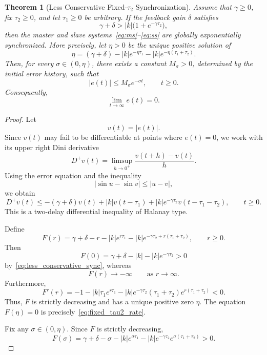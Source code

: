 \documentclass[11pt]{article}
\newtheorem{theorem}{Theorem}[section]
\theoremstyle{remark}
\begin{document}
{


\begin{theorem}[Less Conservative Fixed-$\tau_2$ Synchronization]
\label{thm:fixed_tau2_sync}
Assume that $\gamma\geq0$, fix $\tau_2\geq0$, and let $\tau_1\geq0$ be arbitrary. If the feedback gain $\delta$ satisfies
\begin{equation}
\gamma+\delta>|k|\bigl(1+e^{-\gamma\tau_2}\bigr),
\label{eq:less_conservative_sync}
\end{equation}
then the master and slave systems~\eqref{eq:ms}--\eqref{eq:ss} are globally exponentially synchronized. More precisely, let $\eta>0$ be the unique positive solution of
\begin{equation}
\eta
=
(\gamma+\delta)
-|k|e^{-\eta\tau_1}
-|k|e^{-\eta(\tau_1+\tau_2)}.
\label{eq:fixed_tau2_rate}
\end{equation}
Then, for every $\sigma\in(0,\eta)$, there exists a constant $M_\sigma>0$, determined by the initial error history, such that
\begin{equation}
|e(t)|\leq M_\sigma e^{-\sigma t},
\qquad t\geq0.
\label{eq:fixed_tau2_decay}
\end{equation}
Consequently,
\[
\lim_{t\to\infty}e(t)=0.
\]
\end{theorem}

\begin{proof}
Let
\[
v(t)=|e(t)|.
\]
Since $v(t)$ may fail to be differentiable at points where $e(t)=0$, we work with its upper right Dini derivative
\[
D^+v(t)
=
\limsup_{h\to0^+}
\frac{v(t+h)-v(t)}{h}.
\]
Using the error equation and the inequality
\[
|\sin u-\sin v|\leq |u-v|,
\]
we obtain
\begin{equation}
D^+v(t)
\leq
-(\gamma+\delta)v(t)
+|k|v(t-\tau_1)
+|k|e^{-\gamma\tau_2}
v(t-\tau_1-\tau_2),
\qquad t\geq0.
\label{eq:fixed_tau2_dini}
\end{equation}
This is a two-delay differential inequality of Halanay type.

Define
\[
F(r)
=
\gamma+\delta-r
-|k|e^{r\tau_1}
-|k|e^{-\gamma\tau_2+r(\tau_1+\tau_2)},
\qquad r\geq0.
\]
Then
\[
F(0)
=
\gamma+\delta-|k|-|k|e^{-\gamma\tau_2}>0
\]
by~\eqref{eq:less_conservative_sync}, whereas
\[
F(r)\to-\infty
\qquad\text{as }r\to\infty.
\]
Furthermore,
\[
F'(r)
=
-1
-|k|\tau_1e^{r\tau_1}
-|k|e^{-\gamma\tau_2}
(\tau_1+\tau_2)e^{r(\tau_1+\tau_2)}
<0.
\]
Thus, $F$ is strictly decreasing and has a unique positive zero $\eta$. The equation $F(\eta)=0$ is precisely~\eqref{eq:fixed_tau2_rate}.

Fix any $\sigma\in(0,\eta)$. Since $F$ is strictly decreasing,
\[
F(\sigma)
=
\gamma+\delta-\sigma
-|k|e^{\sigma\tau_1}
-|k|e^{-\gamma\tau_2}
e^{\sigma(\tau_1+\tau_2)}
>0.
\label{eq:positive_margin_sigma}
\]


\end{proof}}
\end{document}
